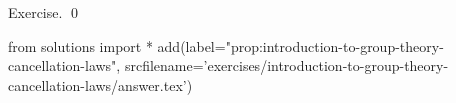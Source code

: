 
\begin{prop} 
  \label{prop:introduction-to-group-theory-cancellation-laws}
  
\end{prop}
\proof
Exercise.
\qed
\begin{python0}
from solutions import *
add(label="prop:introduction-to-group-theory-cancellation-laws",
    srcfilename='exercises/introduction-to-group-theory-cancellation-laws/answer.tex') 
\end{python0}
